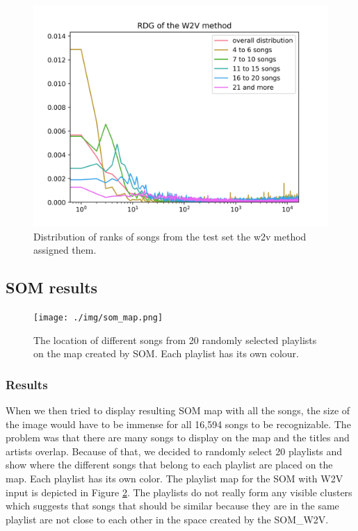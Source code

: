 \begin{figure}[h]
    \centering
	\includegraphics[width=120mm]{./img/w2v_graph.png}
	\caption{Distribution of ranks of songs from the test set the w2v method assigned them.}
	\label{fig:w2v_distribution}
\end{figure}

\subsection{SOM results}\label{ssec:som_results}

\begin{figure}
    \centering
	\texttt{[image: ./img/som\_map.png]}
	\caption{The location of different songs from 20 randomly selected playlists on the map created by SOM. Each playlist has its own colour.}
	\label{fig:som_map}
\end{figure}

\subsubsection{Results}
When we then tried to display resulting SOM map with all the songs, the size of the image would have to be immense for all 16,594 songs to be recognizable. The problem was that there are many songs to display on the map and the titles and artists overlap. Because of that, we decided to randomly select 20 playlists and show where the different songs that belong to each playlist are placed on the map. Each playlist has its own color. The playlist map for the SOM with W2V input is depicted in Figure \ref{fig:som_map}. The playlists do not really form any visible clusters which suggests that songs that should be similar because they are in the same playlist are not close to each other in the space created by the SOM\_W2V. 

